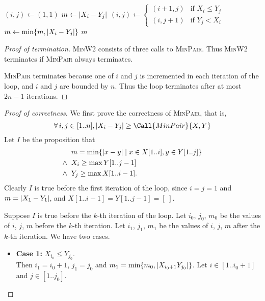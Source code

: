 \documentclass[12pt]{article}
\begin{document}
\begin{solution}
\begin{enumerate}[wide]
\begin{algorithm}[H]
\begin{algorithmic}[1]
                        \State $(i, j) \gets (1, 1)$
                        \State $m \gets \abs{X_{i} - Y_{j}}$
                            \State $(i, j) \gets \begin{cases}
                                (i + 1, j) & \text{if } X_{i} \leq Y_{j} \\
                                (i, j + 1) & \text{if } Y_{j} < X_{i}
                            \end{cases}$
                            \State $m \gets \min\set{m, \abs{X_{i} - Y_{j}}}$
                        \EndWhile
                        \State \Return $m$
                    \EndFunction
                \end{algorithmic}
            \end{algorithm}
            \begin{proof}[Proof of termination]
                \textsc{MinW2} consists of three calls to \textsc{MinPair}.
                Thus \textsc{MinW2} terminates if \textsc{MinPair} always terminates.

                \textsc{MinPair} terminates because one of $i$ and $j$ is incremented
                in each iteration of the loop, and $i$ and $j$ are bounded by $n$.
                Thus the loop terminates after at most $2n - 1$ iterations.
            \end{proof}
            \begin{proof}[Proof of correctness]
                We first prove the correctness of \textsc{MinPair}, that is, \[
                    \forall i, j \in [1..n], \abs{X_{i} - Y_{j}} \geq \Call{MinPair}{X, Y}
                \] Let $I$ be the proposition that \begin{align*}
                    &m = \min\set{\abs{x - y} \mid x \in X[1..i], y \in Y[1..j]} \\
                    \land\;\; &X_{i} \geq \max Y[1..j-1] \\
                    \land\;\; &Y_{j} \geq \max X[1..i-1].
                \end{align*} Clearly $I$ is true before the first iteration of the loop,
                since $i = j = 1$ and $m = \abs{X_{1} - Y_{1}}$, and
                $X[1..i-1] = Y[1..j-1] = [\;]$.

                Suppose $I$ is true before the $k$-th iteration of the loop.
                Let $i_0$, $j_0$, $m_0$ be the values of $i$, $j$, $m$ before the
                $k$-th iteration.
                Let $i_1$, $j_1$, $m_1$ be the values of $i$, $j$, $m$ after the
                $k$-th iteration.
                We have two cases.
                \begin{itemize}
                    \item \textbf{Case 1:} $X_{i_0} \leq Y_{j_0}$. \\
                        Then $i_1 = i_0 + 1$, $j_1 = j_0$ and
                        $m_1 = \min\set{m_0, \abs{X_{i_0 + 1} Y_{j_0}}}$.
                        Let $i \in [1..i_0 + 1]$ and $j \in [1..j_0]$.


\end{itemize}
\end{proof}
\end{enumerate}
\end{solution}
\end{document}
